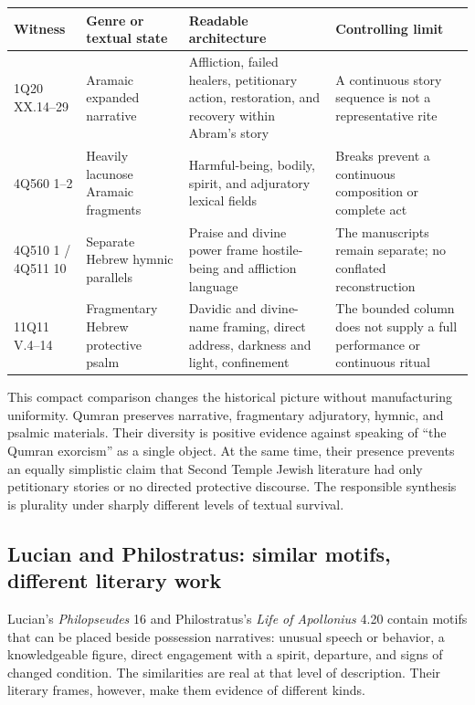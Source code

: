\begin{center}
\small
\begin{tabularx}{\textwidth}{@{}p{}p{}
  >{\RaggedRight\arraybackslash}X
  >{\RaggedRight\arraybackslash}X@{}}
\toprule
Witness & Genre or textual state & Readable architecture & Controlling limit \\
\midrule
1Q20 XX.14--29 & Aramaic expanded narrative & Affliction, failed healers,
petitionary action, restoration, and recovery within Abram's story & A
continuous story sequence is not a representative rite \\
4Q560 1--2 & Heavily lacunose Aramaic fragments & Harmful-being, bodily,
spirit, and adjuratory lexical fields & Breaks prevent a continuous
composition or complete act \\
4Q510 1 / 4Q511 10 & Separate Hebrew hymnic parallels & Praise and divine
power frame hostile-being and affliction language & The manuscripts remain
separate; no conflated reconstruction \\
11Q11 V.4--14 & Fragmentary Hebrew protective psalm & Davidic and divine-name
framing, direct address, darkness and light, confinement & The bounded column
does not supply a full performance or continuous ritual \\
\bottomrule
\end{tabularx}
\end{center}

This compact comparison changes the historical picture without manufacturing
uniformity. Qumran preserves narrative, fragmentary adjuratory, hymnic, and
psalmic materials. Their diversity is positive evidence against speaking of
``the Qumran exorcism'' as a single object. At the same time, their presence
prevents an equally simplistic claim that Second Temple Jewish literature had
only petitionary stories or no directed protective discourse. The responsible
synthesis is plurality under sharply different levels of textual survival.

\subsection{Lucian and Philostratus: similar motifs, different literary work}

Lucian's \emph{Philopseudes} 16 and Philostratus's \emph{Life of Apollonius}
4.20 contain motifs that can be placed beside possession narratives: unusual
speech or behavior, a knowledgeable figure, direct engagement with a spirit,
departure, and signs of changed condition. The similarities are real at that
level of description. Their literary frames, however, make them evidence of
different kinds.

